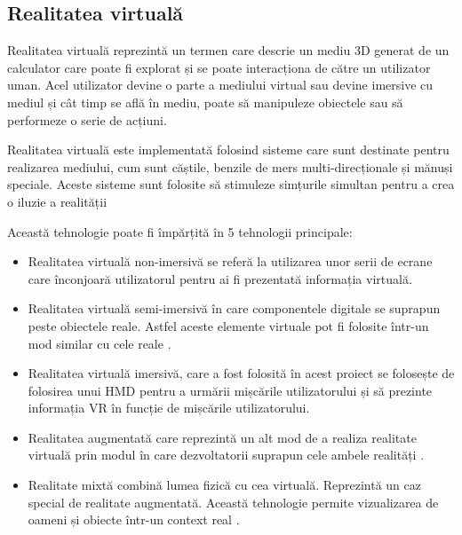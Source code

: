 \subsection{Realitatea virtuală}
Realitatea virtuală reprezintă un termen care descrie un mediu 3D generat de un calculator care poate fi explorat și se poate interacționa de către un utilizator uman. Acel utilizator devine o parte a mediului virtual sau devine imersive cu mediul și cât timp se află în mediu, poate să manipuleze obiectele sau să performeze o serie de acțiuni.

Realitatea virtuală este implementată folosind sisteme care sunt destinate pentru realizarea mediului, cum sunt căștile, benzile de mers multi-direcționale și mănuși speciale. Aceste sisteme sunt folosite să stimuleze simțurile simultan pentru a crea o iluzie a realității


Această tehnologie poate fi împărțită în 5 tehnologii principale: 
\begin{itemize}
	\item Realitatea virtuală non-imersivă se referă la utilizarea unor serii de ecrane care înconjoară utilizatorul pentru ai fi prezentată informația virtuală\cite{vr}.
	
	\item Realitatea virtuală semi-imersivă în care componentele digitale se suprapun peste obiectele reale. Astfel aceste elemente virtuale pot fi folosite într-un mod similar cu cele reale \cite{vr3}.
	
	\item Realitatea virtuală imersivă, care a fost folosită în acest proiect se folosește de folosirea unui HMD pentru a urmării mișcările utilizatorului și să prezinte informația VR în funcție de mișcările utilizatorului\cite{vr}.
	
	\item Realitatea augmentată care reprezintă un alt mod de a realiza realitate virtuală prin modul în care dezvoltatorii suprapun cele ambele realități \cite{vr3}.
	
	\item Realitate mixtă combină lumea fizică cu cea virtuală. Reprezintă un caz special de realitate augmentată. Această tehnologie permite vizualizarea de oameni și obiecte într-un context real \cite{vr3}.
\end{itemize}






